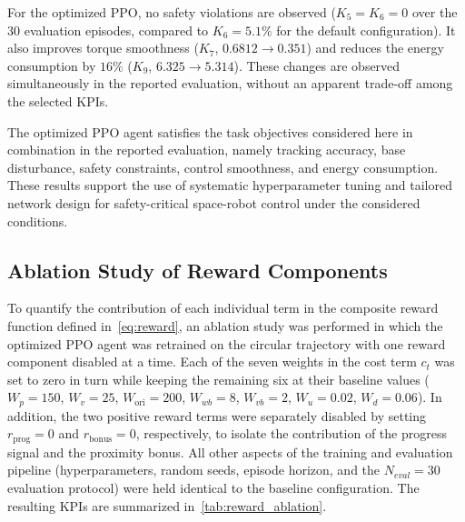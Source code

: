 \documentclass{ieeeaccess}
\begin{document}
For the optimized PPO, no safety violations are observed ($K_5 = K_6 = 0$
over the 30 evaluation episodes, compared to $K_6 = 5.1\%$ for the default configuration).
It also improves torque smoothness ($K_7$, $0.6812 \to 0.351$) and reduces the energy consumption
by $16\%$ ($K_9$, $6.325 \to 5.314$). These changes are observed simultaneously in the reported
evaluation, without an apparent trade-off among the selected KPIs.

The optimized PPO agent satisfies the task objectives considered here in combination in the
reported evaluation, namely tracking accuracy, base disturbance, safety constraints, control smoothness, and energy consumption.
These results support the use of systematic hyperparameter tuning and tailored network design for
safety-critical space-robot control under the considered conditions.

\subsection{Ablation Study of Reward Components}\label{sec:reward_ablation}
To quantify the contribution of each individual term in the composite reward function defined
in~\autoref{eq:reward},
an ablation study was performed in which the optimized PPO agent was retrained on
the circular trajectory with one reward component
disabled at a time. Each of the seven weights in the cost term $c_t$
was set to zero in turn while keeping the remaining six at
their baseline values ($W_p=150$, $W_v=25$, $W_{\mathrm{ori}}=200$, $W_{wb}=8$, $W_{vb}=2$, $W_u=0.02$, $W_d=0.06$). In addition,
the two positive reward terms were separately disabled by setting $r_{\text{prog}}=0$ and $r_{\text{bonus}}=0$, respectively,
to isolate the contribution of the progress signal and the proximity bonus. All other
aspects of the training and evaluation
pipeline (hyperparameters, random seeds, episode horizon, and the $N_{eval}=30$ evaluation protocol) were held identical
to
the baseline configuration. The resulting KPIs are summarized in~\autoref{tab:reward_ablation}.
\end{document}
